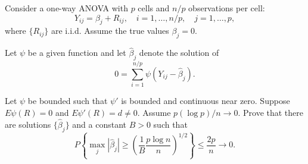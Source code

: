 \begin{exercise}\label{probability:2025:4}
Consider a one-way ANOVA with $p$ cells and $n/p$ observations per cell:
\[
Y_{ij} = \beta_j + R_{ij}, \quad i = 1, \dots, n/p, \quad j = 1, \dots, p,
\]
where $\{R_{ij}\}$ are i.i.d. Assume the true values $\beta_j = 0$.

Let $\psi$ be a given function and let $\hat{\beta}_j$ denote the solution of
\[
0 = \sum_{i=1}^{n/p} \psi(Y_{ij} - \hat{\beta}_j).
\]

Let $\psi$ be bounded such that $\psi'$ is bounded and continuous near zero. Suppose $E\psi(R) = 0$ and $E\psi'(R) = d \neq 0$. Assume $p(\log p)/n \to 0$. Prove that there are solutions $\{\hat{\beta}_j\}$ and a constant $B > 0$ such that
\[
P\left\{\max_j |\hat{\beta}_j| \geq \left(\frac{1}{B}\frac{p\log n}{n}\right)^{1/2}\right\} \leq \frac{2p}{n} \to 0.
\]

\end{exercise}

